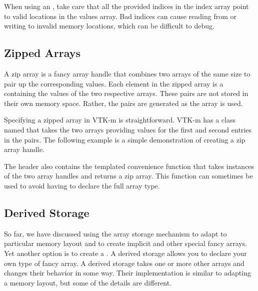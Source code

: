 When using an , take care that all
the provided indices in the index array point to valid locations in the
values array. Bad indices can cause reading from or writing to invalid
memory locations, which can be difficult to debug.


\subsection{Zipped Arrays}
\label{sec:ZippedArrays}


A zip array is a fancy array handle that combines two arrays of the same
size to pair up the corresponding values. Each element in the zipped array
is a  containing the values of the two respective arrays. These
pairs are not stored in their own memory space. Rather, the pairs are
generated as the array is used.

Specifying a zipped array in VTK-m is straightforward. VTK-m has a class
named  that takes the two arrays providing values
for the first and second entries in the pairs. The following example is a
simple demonstration of creating a zip array handle.


The  header also contains the
templated convenience function  that takes
instances of the two array handles and returns a zip array. This function
can sometimes be used to avoid having to declare the full array type.



\subsection{Derived Storage}
\label{sec:DerivedStorage}


So far, we have discussed using the array storage mechanism to adapt to
particular memory layout and to create implicit and other special fancy
arrays. Yet another option is to create a . A
derived storage allows you to declare your own type of fancy array. A
derived storage takes one or more other arrays and changes their behavior
in some way. Their implementation is similar to adapting a memory layout,
but some of the details are different.

